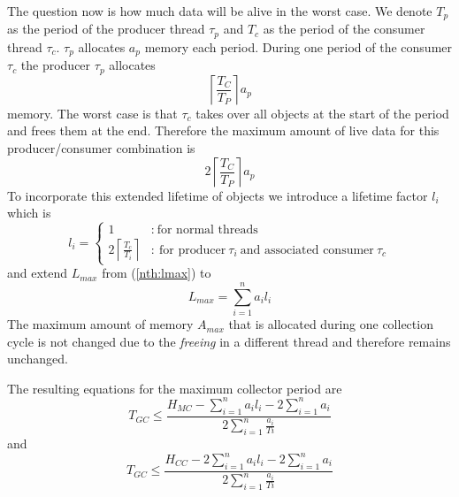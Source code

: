 The question now is how much data will be alive in the worst case.
We denote $T_p$ as the period of the producer thread $\tau_p$ and
$T_c$ as the period of the consumer thread $\tau_c$. $\tau_p$
allocates $a_p$ memory each period. During one period of the
consumer $\tau_c$ the producer $\tau_p$ allocates
\begin{equation*}
    \left\lceil\frac{T_C}{T_P}\right\rceil a_p
\end{equation*}
memory. The worst case is that $\tau_c$ takes over all objects at
the start of the period and frees them at the end. Therefore the
maximum amount of live data for this producer/consumer combination
is
\begin{equation*}
    2\left\lceil\frac{T_C}{T_P}\right\rceil a_p
\end{equation*}
To incorporate this extended lifetime of objects we introduce a
lifetime factor $l_i$ which is
\begin{equation}\label{equ:liv:fac}
    l_i = \left\{
    \begin{array}{ll}
    1 & :\ \mbox{for normal threads}\\
    2\left\lceil\frac{T_c}{T_i}\right\rceil & :
    \ \mbox{for producer}\ \tau_i\ \mbox{and associated consumer}\ \tau_c
    \end{array}
    \right.
\end{equation}
and extend $L_{max}$ from (\ref{nth:lmax}) to
\begin{equation}
    L_{max} = \sum_{i=1}^{n} a_i l_i
\end{equation}
The maximum amount of memory $A_{max}$ that is allocated during one
collection cycle is not changed due to the \emph{freeing} in a
different thread and therefore remains unchanged.

The resulting equations for the maximum collector period are
\begin{equation}
    T_{GC} \le \frac{H_{MC}-\sum_{i=1}^{n} a_i l_i - 2\sum_{i=1}^{n} a_i}{2\sum_{i=1}^{n} \frac{a_i}{Ti}}
\end{equation}
and
\begin{equation}
    T_{GC} \le \frac{H_{CC}-2\sum_{i=1}^{n} a_i l_i - 2\sum_{i=1}^{n} a_i}{2\sum_{i=1}^{n}
    \frac{a_i}{Ti}}
\end{equation}




%



